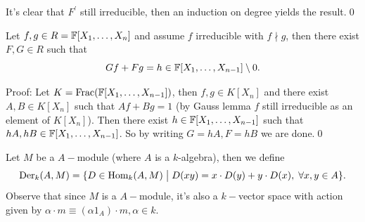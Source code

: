 \begin{itemize}
  It's clear that $F^\prime$ still irreducible, then an induction on degree yields the result.\qed
  \begin{corollary}\label{corollary: generalized gcd}
    Let $f,g\in R=\mathbb{F}[X_1,\dots, X_n]$ and assume $f$ irreducible with $f\nmid g$, then there exist $F,G\in R$ such that 
    \begin{equation}
        Gf + Fg = h\in \mathbb{F}[X_1,\dots,X_{n-1}]\setminus0.
    \end{equation}
  \end{corollary}
  Proof: Let $K=\text{Frac}(\mathbb{F}[X_1,\dots,X_{n-1}])$, then $f,g\in K[X_n]$ and there exist 
  $A,B\in K[X_n]$ such that $Af + Bg = 1$ (by Gauss lemma $f$ still irreducible as an element of 
  $K[X_n]$). Then there exist $h\in \mathbb{F}[X_1,\dots,X_{n-1}]$ such that 
  $hA, hB\in \mathbb{F}[X_1,\dots,X_{n-1}]$. So by writing $G=hA, F =hB$ we are done.\qed
\begin{notation}
    Let $M$ be a $A-$module (where $A$ is a $k$-algebra), then we define
    \begin{equation}
        \text{Der}_k(A,M)=\{D\in\text{Hom}_k(A,M)\;\big|\;D(xy)=x\cdot D(y) + y\cdot D(x),\;\forall x,y\in A\}.
    \end{equation} 
    Observe that since $M$ is a $A-$module, it's also a $k-$vector space with action given by 
    $\alpha\cdot m\equiv (\alpha 1_A)\cdot m,\alpha\in k$.
\end{notation}


\end{itemize}
